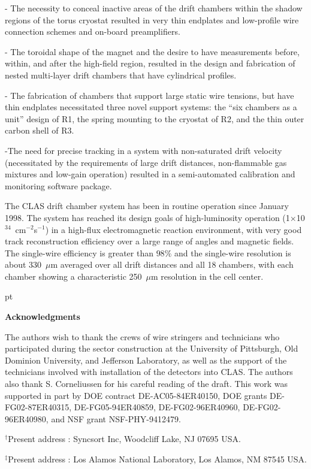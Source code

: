 \vskip 10pt
\noindent
- The necessity to conceal inactive areas of the drift chambers within the
shadow regions of the torus cryostat resulted in very thin endplates and low-profile
wire connection schemes and on-board preamplifiers.

\noindent
- The toroidal shape of the magnet and the desire to have measurements before, within, 
and after the high-field region, resulted in the design and fabrication of nested 
multi-layer drift chambers that have cylindrical profiles.

\noindent
- The fabrication of chambers that support large static wire tensions, but have thin 
endplates necessitated three novel support systems: the ``six chambers as a unit'' 
design of R1, the spring mounting to the cryostat of R2, and the thin outer carbon 
shell of R3.

\noindent
-The need for precise tracking in a system with non-saturated drift velocity 
(necessitated by the requirements of large drift distances, non-flammable gas mixtures 
and low-gain operation) resulted in a semi-automated calibration and monitoring software 
package.

\vskip 10pt
The CLAS drift chamber system has been in routine operation since January 1998. 
The system has reached its design goals of 
high-luminosity operation (1$\times$10$^{34}$~cm$^{-2}$s$^{-1}$) in a 
high-flux electromagnetic reaction environment, with very good track 
reconstruction efficiency over a large range of angles and 
magnetic fields.  The single-wire efficiency is greater than $98\%$ and the
single-wire resolution is about 330~$\mu$m averaged over all drift distances and
all 18 chambers, with each chamber showing a characteristic 250~$\mu$m resolution 
in the cell center.

 pt

{\large{\bf Acknowledgments}}

\vskip 10pt

The authors wish to thank the crews of wire stringers and technicians who 
participated during the sector construction at the University of Pittsburgh,
Old Dominion University, and Jefferson Laboratory, as well as the support of 
the technicians involved with installation of the detectors into CLAS.  The
authors also thank S. Corneliussen for his careful reading of the draft.  This
work was supported in part by DOE contract DE-AC05-84ER40150, DOE grants 
DE-FG02-87ER40315, DE-FG05-94ER40859, DE-FG02-96ER40960, DE-FG02-96ER40980, 
and NSF grant NSF-PHY-9412479.

\vskip 10pt

\noindent
$^{\dagger}$Present address : Syncsort Inc, Woodcliff Lake, NJ 07695 USA.

\noindent
$^{\ddagger}$Present address : Los Alamos National Laboratory, Los Alamos, NM
87545 USA.


